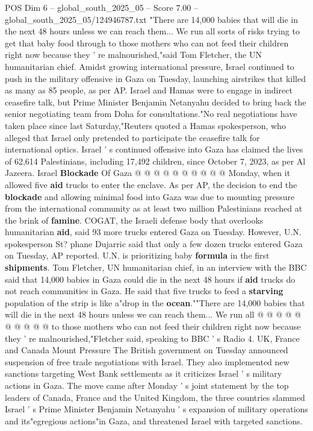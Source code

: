 \begin{textsample}{POS Dim 6 – global\_south\_2025\_05 – Score 7.00 – global\_south\_2025\_05/124946787.txt}  \label{ex:f6_pos_058}
"There are 14,000 babies that will die in the next 48 hours unless we can reach them...
We run all sorts of risks trying to get that baby food through to those mothers who can not feed their children right now because they ' re malnourished,"said Tom Fletcher, the UN humanitarian chief.
Amidst growing international pressure, Israel continued to push in the military offensive in Gaza on Tuesday, launching airstrikes that killed as many as 85 people, as per AP.
Israel and Hamas were to engage in indirect ceasefire talk, but Prime Minister Benjamin Netanyahu decided to bring back the senior negotiating team from Doha for consultations."No real negotiations have taken place since last Saturday,"Reuters quoted a Hamas spokesperson, who alleged that Israel only pretended to participate the ceasefire talk for international optics.
Israel ' s continued offensive into Gaza has claimed the lives of 62,614 Palestinians, including 17,492 children, since October 7, 2023, as per Al Jazeera.
Israel \textbf{Blockade} Of Gaza @ @ @ @ @ @ @ @ @ @ Monday, when it allowed five \textbf{aid} trucks to enter the enclave.
As per AP, the decision to end the \textbf{blockade} and allowing minimal food into Gaza was due to mounting pressure from the international community as at least two million Palestinians reached at the brink of \textbf{famine}.
COGAT, the Israeli defense body that overlooks humanitarian \textbf{aid}, said 93 more trucks entered Gaza on Tuesday.
However, U.N. spokesperson St? phane Dujarric said that only a few dozen trucks entered Gaza on Tuesday, AP reported.
U.N. is prioritizing baby \textbf{formula} in the first \textbf{shipments}.
Tom Fletcher, UN humanitarian chief, in an interview with the BBC said that 14,000 babies in Gaza could die in the next 48 hours if \textbf{aid} trucks do not reach communities in Gaza.
He said that five trucks to feed a \textbf{starving} population of the strip is like a"drop in the \textbf{ocean}.""There are 14,000 babies that will die in the next 48 hours unless we can reach them...
We run all @ @ @ @ @ @ @ @ @ @ to those mothers who can not feed their children right now because they ' re malnourished,"Fletcher said, speaking to BBC ' s Radio 4.
UK, France and Canada Mount Pressure The British government on Tuesday announced suspension of free trade negotiations with Israel.
They also implemented new sanctions targeting West Bank settlements as it criticizes Israel ' s military actions in Gaza.
The move came after Monday ' s joint statement by the top leaders of Canada, France and the United Kingdom, the three countries slammed Israel ' s Prime Minister Benjamin Netanyahu ' s expansion of military operations and its"egregious actions"in Gaza, and threatened Israel with targeted sanctions.

\end{textsample}
